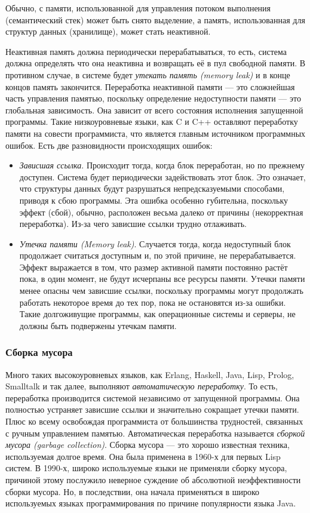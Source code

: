 Обычно, с памяти, использованной для управления потоком выполнения (семантический стек) может быть снято выделение, а память, использованная для структур данных (хранилище), может стать неактивной.

Неактивная память должна периодически перерабатываться, то есть, система должна определять что она неактивна и возвращать её в пул свободной памяти. В противном случае, в системе будет \emph{утекать память (memory leak)} и в конце концов память закончится. Переработка неактивной памяти --- это сложнейшая часть управления памятью, поскольку определение недоступности памяти --- это глобальная зависимость. Она зависит от всего состояния исполнения запущенной программы. Такие низкоуровневые языки, как C и C++ оставляют переработку памяти на совести программиста, что является главным источником программных ошибок. Есть две разновидности происходящих ошибок:

\begin{itemize}
\item{\emph{Зависшая ссылка}. Происходит тогда, когда блок переработан, но по прежнему доступен. Система будет периодически задействовать этот блок. Это означает, что структуры данных будут разрушаться непредсказуемыми способами, приводя к сбою программы. Эта ошибка особенно губительна, поскольку эффект (сбой), обычно, расположен весьма далеко от причины (некорректная переработка). Из-за чего зависшие ссылки трудно отлаживать.}

\item{\emph{Утечка памяти (Memory leak)}. Случается тогда, когда недоступный блок продолжает считаться доступным и, по этой причине, не перерабатывается. Эффект выражается в том, что размер активной памяти постоянно растёт пока, в один момент, не будут исчерпаны все ресурсы памяти. Утечки памяти менее опасны чем зависшие ссылки, поскольку программы могут продолжать работать некоторое время до тех пор, пока не остановятся из-за ошибки. Такие долгоживущие программы, как операционные системы и серверы, не должны быть подвержены утечкам памяти.}
\end{itemize}

\subsubsection{Сборка мусора}

Много таких высокоуровневых языков, как Erlang, Haskell, Java, Lisp, {Prolog}, Smalltalk и так далее, выполняют \emph{автоматическую переработку}. То есть, переработка производится системой независимо от запущенной программы. Она полностью устраняет зависшие ссылки и значительно сокращает утечки памяти. Плюс ко всему освобождая программиста от большинства трудностей, связанных с ручным управлением памятью. Автоматическая переработка называется \emph{сборкой мусора (garbage collection)}. Сборка мусора --- это хорошо известная техника, используемая долгое время. Она была применена в 1960-х для первых Lisp систем. В 1990-х, широко используемые языки не применяли сборку мусора, причиной этому послужило неверное суждение об абсолютной неэффективности сборки мусора. Но, в последствии, она начала применяться в широко используемых языках программирования по причине популярности языка Java.

